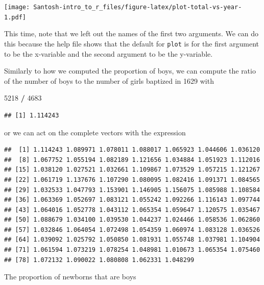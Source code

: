 \documentclass[]{article}
\newenvironment{Shaded}{\begin{snugshade}}{\end{snugshade}}
\newcommand{\DecValTok}[1]{\textcolor[rgb]{0.00,0.00,0.81}{#1}}
\newcommand{\StringTok}[1]{\textcolor[rgb]{0.31,0.60,0.02}{#1}}
\newcommand{\OperatorTok}[1]{\textcolor[rgb]{0.81,0.36,0.00}{\textbf{#1}}}
\newcommand{\NormalTok}[1]{#1}
\begin{document}
\texttt{[image: Santosh-intro\_to\_r\_files/figure-latex/plot-total-vs-year-1.pdf]}

This time, note that we left out the names of the first two arguments.
We can do this because the help file shows that the default for
\texttt{plot} is for the first argument to be the x-variable and the
second argument to be the y-variable.

Similarly to how we computed the proportion of boys, we can compute the
ratio of the number of boys to the number of girls baptized in 1629 with

\begin{Shaded}
\begin{Highlighting}[]
\DecValTok{5218} \OperatorTok{/}\StringTok{ }\DecValTok{4683}
\end{Highlighting}
\end{Shaded}

\begin{verbatim}
## [1] 1.114243
\end{verbatim}

or we can act on the complete vectors with the expression

\begin{Shaded}
\end{Shaded}

\begin{verbatim}
##  [1] 1.114243 1.089971 1.078011 1.088017 1.065923 1.044606 1.036120
##  [8] 1.067752 1.055194 1.082189 1.121656 1.034884 1.051923 1.112016
## [15] 1.038120 1.027521 1.032661 1.109867 1.073529 1.057215 1.121267
## [22] 1.061719 1.137676 1.107290 1.080095 1.082416 1.091371 1.084565
## [29] 1.032533 1.047793 1.153901 1.146905 1.156075 1.085988 1.108584
## [36] 1.063369 1.052697 1.083121 1.055242 1.092266 1.116143 1.097744
## [43] 1.064016 1.052778 1.043112 1.065354 1.059647 1.120575 1.035467
## [50] 1.088679 1.034100 1.039530 1.044237 1.024466 1.058536 1.062860
## [57] 1.032846 1.064054 1.072498 1.054359 1.060974 1.083128 1.036526
## [64] 1.039092 1.025792 1.050850 1.081931 1.055748 1.037981 1.104904
## [71] 1.061594 1.073219 1.078254 1.048981 1.010673 1.065354 1.075460
## [78] 1.072132 1.090022 1.080808 1.062331 1.048299
\end{verbatim}

The proportion of newborns that are boys
\end{document}

